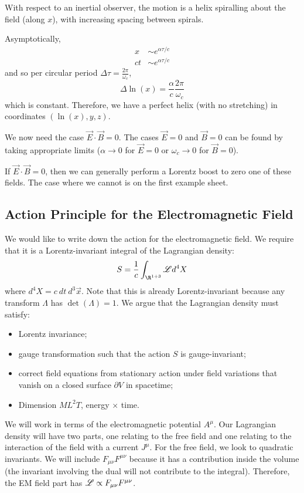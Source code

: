 \documentclass[../Main.tex]{subfiles}
\begin{document}
With respect to an inertial observer, the motion is a helix spiralling about the field (along $x$), with increasing spacing between spirals.

Asymptotically,
\begin{align*}
    x &\sim e^{\alpha \tau / c} \\
    ct &\sim e^{\alpha \tau / c}
\end{align*}
and so per circular period $\Delta \tau = \frac{2\pi}{\omega_c}$,
\begin{equation*}
    \Delta \ln(x) = \frac{\alpha}{c} \frac{2\pi}{\omega_c}
\end{equation*}
which is constant. Therefore, we have a perfect helix (with no stretching) in coordinates $(\ln(x), y, z)$.

We now need the case $\vec{E} \cdot \vec{B} = 0$. The cases $\vec{E} = 0$ and $\vec{B} = 0$ can be found by taking appropriate limits ($\alpha \to 0$ for $\vec{E} = 0$ or $\omega_c \to 0$ for $\vec{B} = 0$).

If $\vec{E} \cdot \vec{B} = 0$, then we can generally perform a Lorentz boost to zero one of these fields. The case where we cannot is on the first example sheet.
\subsection{Action Principle for the Electromagnetic Field}
We would like to write down the action for the electromagnetic field. We require that it is a Lorentz-invariant integral of the Lagrangian density:
\begin{equation*}
    S = \frac1c\int_{\R^{1 + 3}} \Lag d^4X
\end{equation*}
where $d^4X = c~dt~d^3\vec{x}$. Note that this is already Lorentz-invariant because any transform $\Lambda$ has $\det(\Lambda) = 1$. We argue that the Lagrangian density must satisfy:
\begin{itemize}
    \item Lorentz invariance;
    \item gauge transformation such that the action $S$ is gauge-invariant;
    \item correct field equations from stationary action under field variations that vanish on a closed surface $\partial V$ in spacetime;
    \item Dimension $ML^2T$, energy $\times$ time.
\end{itemize}
We will work in terms of the electromagnetic potential $A^\mu$. Our Lagrangian density will have two parts, one relating to the free field and one relating to the interaction of the field with a current $J^\mu$. For the free field, we look to quadratic invariants. We will include $F_{\mu\nu} F^{\mu\nu}$ because it has a contribution inside the volume (the invariant involving the dual will not contribute to the integral). Therefore, the EM field part has $\mathscr{L} \propto F_{\mu\nu} F^{\mu\nu}$.
\end{document}
